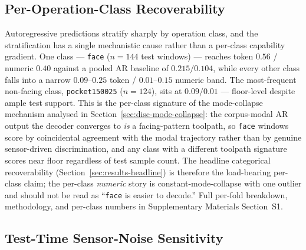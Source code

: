 \documentclass[sensors,article,submit,moreauthors,pdftex]{Definitions/mdpi}
\begin{document}
\subsection{Per-Operation-Class Recoverability}
\label{sec:per-op-class}

Autoregressive predictions stratify sharply by operation class, and the stratification has a single mechanistic cause rather than a per-class capability gradient. One class --- \texttt{face} ($n=144$ test windows) --- reaches token $0.56$ / numeric $0.40$ against a pooled AR baseline of $0.215 / 0.104$, while every other class falls into a narrow $0.09$--$0.25$ token / $0.01$--$0.15$ numeric band. The most-frequent non-facing class, \texttt{pocket150025} ($n=124$), sits at $0.09 / 0.01$ --- floor-level despite ample test support. This is the per-class signature of the mode-collapse mechanism analysed in Section~\ref{sec:disc-mode-collapse}: the corpus-modal AR output the decoder converges to \emph{is} a facing-pattern toolpath, so \texttt{face} windows score by coincidental agreement with the modal trajectory rather than by genuine sensor-driven discrimination, and any class with a different toolpath signature scores near floor regardless of test sample count. The headline categorical recoverability (Section~\ref{sec:results-headline}) is therefore the load-bearing per-class claim; the per-class \emph{numeric} story is constant-mode-collapse with one outlier and should not be read as ``\texttt{face} is easier to decode.'' Full per-fold breakdown, methodology, and per-class numbers in Supplementary Materials Section~S1.

\subsection{Test-Time Sensor-Noise Sensitivity}
\label{sec:noise-sensitivity}
\end{document}
